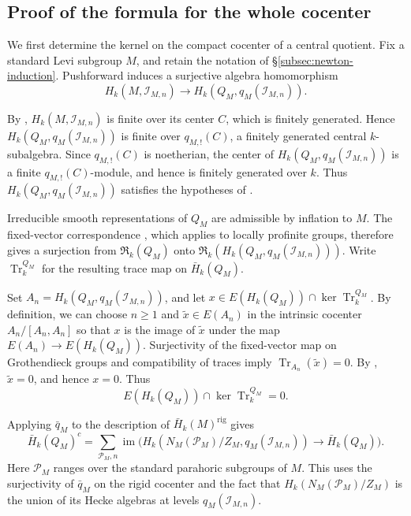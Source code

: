 \documentclass[11pt,letterpaper]{amsart}
\theoremstyle{definition}
\numberwithin{equation}{section}
\numberwithin{theorem}{section}
\let\ge\geqslant
\newcommand{\kk}{k}
\newcommand{\CI}{\mathcal I}
\newcommand{\cR}{\mathfrak R}
\newcommand{\rig}{\mathrm{rig}}
\DeclareMathOperator{\Tr}{Tr}
\DeclareMathOperator{\im}{im}
\begin{document}
\subsection{Proof of the formula for the whole cocenter}
\label{subsec:whole-kernel-proof}

We first determine the kernel on the compact cocenter of a central quotient. Fix a standard Levi subgroup $M$, and retain the notation of \S\ref{subsec:newton-induction}. Pushforward induces a surjective algebra homomorphism
\[
 H_\kk(M,\CI_{M,n})
   \longrightarrow H_\kk(Q_M,q_M(\CI_{M,n})).
\]

By , $H_\kk(M,\CI_{M,n})$ is finite over its center $C$, which is finitely generated. Hence $H_\kk(Q_M,q_M(\CI_{M,n}))$ is finite over $q_{M,!}(C)$, a finitely generated central $\kk$-subalgebra. Since $q_{M,!}(C)$ is noetherian, the
center of $H_\kk(Q_M,q_M(\CI_{M,n}))$ is a finite $q_{M,!}(C)$-module,
and hence is finitely generated over $\kk$. Thus
$H_\kk(Q_M,q_M(\CI_{M,n}))$ satisfies the hypotheses of
.

Irreducible smooth representations of $Q_M$ are admissible
by inflation to $M$. The fixed-vector correspondence
\cite[Theorem~3.2]{HV}, which applies
to locally profinite groups, therefore gives a surjection
from $\cR_\kk(Q_M)$ onto
$\cR_\kk(H_\kk(Q_M,q_M(\CI_{M,n})))$.
Write $\Tr_\kk^{Q_M}$ for the resulting trace map on $\bar H_\kk(Q_M)$.

Set $A_n=H_\kk(Q_M,q_M(\CI_{M,n}))$, and let $x\in E(H_\kk(Q_M))\cap\ker\Tr_\kk^{Q_M}$. By definition, we can choose $n\ge1$ and $\widetilde x\in E(A_n)$ in the intrinsic cocenter $A_n/[A_n,A_n]$ so that $x$ is the image of $\widetilde x$ under the map $E(A_n) \to E(H_\kk(Q_M))$.
Surjectivity of the fixed-vector map on Grothendieck
groups and compatibility of traces imply
$\Tr_{A_n}(\widetilde x)=0$.
By ,
$\widetilde x=0$, and hence $x=0$. Thus
\begin{equation}\label{eq:sep-qm}
 E(H_\kk(Q_M))\cap\ker\Tr_\kk^{Q_M}=0.
\end{equation}

Applying $\bar q_M$ to the description of $\bar H_\kk(M)^{\rig}$ gives
\begin{equation}\label{eq:span-qm}
 \bar H_\kk(Q_M)^c
   =\sum_{\mathcal P_M,n}
      \im\bigl(
        H_\kk(N_M(\mathcal P_M)/Z_M,q_M(\CI_{M,n}))
        \longrightarrow\bar H_\kk(Q_M)
      \bigr).
\end{equation}
Here $\mathcal P_M$ ranges over the standard parahoric subgroups of $M$. This uses the surjectivity of $\bar q_M$ on the rigid cocenter and the fact that $H_\kk(N_M(\mathcal P_M)/Z_M)$ is the union of its Hecke algebras at levels $q_M(\CI_{M,n})$.
\end{document}

